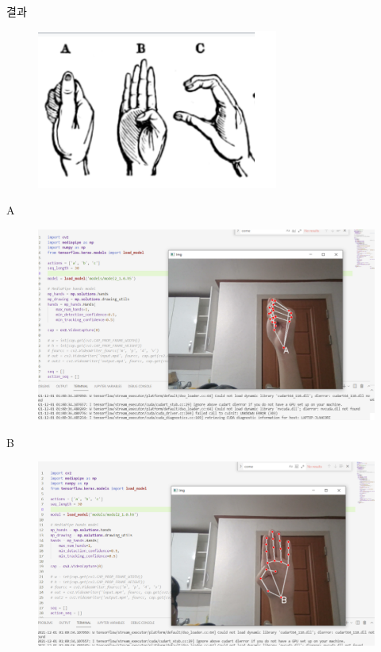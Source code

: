 \documentclass[10pt]{beamer}
\begin{document}
\begin{frame}{결과}
    \begin{figure}
        \includegraphics[width=0.8\columnwidth]{sign.png}
    \end{figure}
\end{frame}


\begin{frame}{A}
    \begin{figure}
        \includegraphics[width=0.8\columnwidth]{A.png}
    \end{figure}
\end{frame}

\begin{frame}{B}
    \begin{figure}
        \includegraphics[width=0.8\columnwidth]{B.png}
    \end{figure}
\end{frame}
\end{document}
